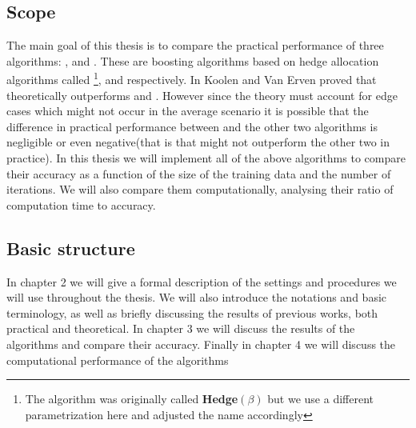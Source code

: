 \subsection{Scope}
The main goal of this thesis is to compare the practical performance of three algorithms: \adaB, \NHB and \squintB. These are boosting algorithms based on hedge allocation algorithms called \hedge\footnote{The algorithm was originally called \textbf{Hedge}$(\beta)$ but we use a different parametrization here and adjusted the name accordingly}, \adaN and \squint respectively. In \cite{Koolen2015} Koolen and Van Erven proved that \squint theoretically outperforms \hedge and \adaN. However since the theory must account for edge cases which might not occur in the average scenario it is possible that the difference in practical performance between \squint and the other two algorithms is negligible or even negative(that is that \squintB might not outperform the other two in practice). In this thesis we will implement all of the above algorithms to compare their accuracy as a function of the size of the training data and the number of iterations. We will also compare them computationally, analysing their ratio of computation time to accuracy.  

\subsection{Basic structure}
In chapter 2 we will give a formal description of the settings and procedures we will use throughout the thesis. We will also introduce the notations and basic terminology, as well as briefly discussing the results of previous works, both practical and theoretical. In chapter 3 we will discuss the results of the algorithms and compare their accuracy. Finally in chapter 4 we will discuss the computational performance of the algorithms    
